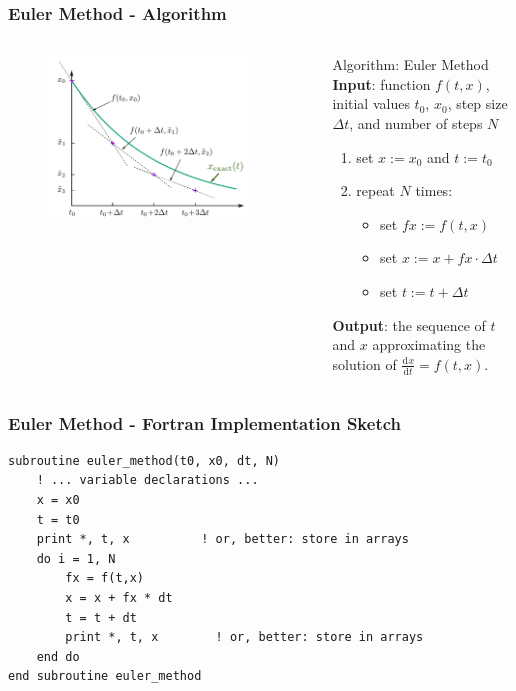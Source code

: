 \documentclass[11pt,aspectratio=169,handout]{beamer}
\newcommand{\dif}[3][]{\frac{\mathrm{d}^{#1}#3}{\mathrm{d}{#2}^{#1}}}
\begin{document}
\begin{frame}
\frametitle{Euler Method - Algorithm}
\begin{columns}
\begin{figure}
	\centering
	\includegraphics[width=0.9\textwidth]{fig/diffeq-euler}
\end{figure}%
\begin{block}{Algorithm: Euler Method}
	\pause
	\textbf{Input}: function $f(t,x)$, initial values $t_0$, $x_0$, step size $\Delta t$, and number of steps $N$
	\pause
	\begin{enumerate}
		\item set $x := x_0$ and $t := t_0$
		\pause
		\item repeat $N$ times:
		\pause
		\begin{itemize}
			\item set $fx := f(t, x)$
			\pause
			\item set $x := x + fx \cdot \Delta t$
			\pause
			\item set $t := t + \Delta t$
		\end{itemize}		
	\end{enumerate}  
	\pause
	\textbf{Output}: the sequence of $t$ and $x$ approximating the solution of $\dif{t}{x} = f(t,x)$.
\end{block}
\end{columns}
\end{frame}

\begin{frame}[fragile]
\label{slide:euler-code}
\frametitle{Euler Method - Fortran Implementation Sketch}
\begin{lstlisting}	
subroutine euler_method(t0, x0, dt, N)
	! ... variable declarations ...
	x = x0
	t = t0
	print *, t, x          ! or, better: store in arrays 
	do i = 1, N
		fx = f(t,x)
		x = x + fx * dt
		t = t + dt
		print *, t, x        ! or, better: store in arrays
	end do
end subroutine euler_method

\end{lstlisting}
\end{frame}
\end{document}

